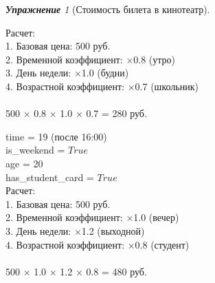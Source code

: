 \documentclass[a4,12pt]{article}
\theoremstyle{remark}
\newtheorem{exercise}{\textbf{Упражнение}}[section]
\begin{document}
\begin{exercise}[Стоимость билета в кинотеатр]
\begin{outputformat}[title=Пример 1]
        Расчет: \\
        1. Базовая цена: 500 руб. \\
        2. Временной коэффициент: ×0.8 (утро) \\
        3. День недели: ×1.0 (будни) \\
        4. Возрастной коэффициент: ×0.7 (школьник) \\
        \\ 
        500 × 0.8 × 1.0 × 0.7 = 280 руб.
    \end{outputformat}
    
    \begin{outputformat}[title=Пример 2]
        time = 19 (после 16:00) \\
        is\_weekend = $True$ \\
        age = 20 \\
        has\_student\_card = $True$ \\
    
        Расчет: \\
        1. Базовая цена: 500 руб. \\
        2. Временной коэффициент: ×1.0 (вечер) \\
        3. День недели: ×1.2 (выходной) \\
        4. Возрастной коэффициент: ×0.8 (студент) \\
        \\ 
        500 × 1.0 × 1.2 × 0.8 = 480 руб.
    \end{outputformat}
    
    
    \end{exercise}
\end{document}
